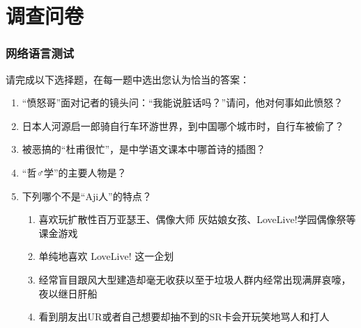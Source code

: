 \section{调查问卷}
\label{wenquan}

\subsubsection{网络语言测试}

请完成以下选择题，在每一题中选出您认为恰当的答案：
\begin{enumerate}
\item “愤怒哥”面对记者的镜头问：“我能说脏话吗？”请问，他对何事如此愤怒？
  \\
\item 日本人河源启一郎骑自行车环游世界，到中国哪个城市时，自行车被偷了？
  \\
\item 被恶搞的“杜甫很忙”，是中学语文课本中哪首诗的插图？
  \\
\item “哲♂学”的主要人物是？
  \\
\item 下列哪个不是“Aji人”的特点？
  \begin{enumerate}
  \item 喜欢玩扩散性百万亚瑟王、偶像大师 灰姑娘女孩、LoveLive!学园偶像祭等课金游戏
  \item 单纯地喜欢 LoveLive! 这一企划 %
  \item 经常盲目跟风大型建造却毫无收获以至于垃圾人群内经常出现满屏哀嚎，夜以继日肝船
  \item 看到朋友出UR或者自己想要却抽不到的SR卡会开玩笑地骂人和打人
  \end{enumerate}
\end{enumerate}

